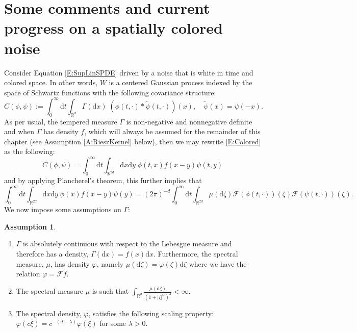 \documentclass[a4paper,11pt]{article}
\numberwithin{equation}{section}
\theoremstyle{plain}
\theoremstyle{definition}
\newtheorem{assumption}[theorem]{Assumption}
\newcommand{\ud}{\ensuremath{\mathrm{d} }}
\newcommand{\R}{\mathbb{R}}
\numberwithin{NQ}{section}
\numberwithin{LQ}{section}
\numberwithin{ZQ}{section}
\begin{document}
\section{Some comments and current progress on a spatially colored noise} \label{S:colorednoise}
Consider Equation \eqref{E:SupLinSPDE} driven by a noise that is white in time and colored space. In
other words, $W$ is a centered Gaussian process indexed by the space of Schwartz functions with the
following covariance structure:
\begin{equation} \label{E:Colored}
  C(\phi, \psi) := \int_0^\infty \ud t \int_{\R^{d}}  \Gamma(\ud x) \; (\phi(t,\cdot)*\tilde{\psi}(t,\cdot))(x), \quad \tilde{\psi}(x) = \psi(-x).
\end{equation}
As per usual, the tempered measure $\Gamma$ is non-negative and nonnegative definite and when
$\Gamma$ has density $f$, which will always be assumed for the remainder of this chapter (see
Assumption \ref{A:RieszKernel} below), then we may rewrite \eqref{E:Colored} as the following:
\[
C(\phi,\psi) = \int_0^\infty \ud t \int_{\R^{2d}} \ud x \ud y \; \phi(t,x) f(x-y) \psi(t,y)
\]
and by applying Plancherel's theorem, this further implies that
\[
\int_0^\infty \ud t \int_{\R^{2d}} \ud x \ud y \; \phi(x) f(x-y) \psi(y) = (2 \pi)^{-d} \int_0^\infty \ud t \int_{\R^{2d}} \mu(\ud \zeta) \mathcal{F}(\phi(t,\cdot))(\zeta) \overline{\mathcal{F}(\psi(t,\cdot))(\zeta)}.
\]
We now impose some assumptions on $\Gamma$:
\begin{assumption} \label{A:NoiseAssum1} $\;$
\begin{enumerate}
  \item $\Gamma$ is absolutely continuous with respect to the Lebesgue measure and therefore has a
    density, $\Gamma(\ud x) = f(x) \ud x$. Furthermore, the spectral measure, $\mu$, has density
    $\varphi$, namely $\mu(\ud \zeta) = \varphi(\zeta) \ud \zeta$ where we have the relation
    $\varphi = \mathcal{F}f$.
  \item The spectral measure $\mu$ is such that $\int_{\R^d} \frac{\mu(\ud \zeta)}{\left(1 +
    |\zeta|^\alpha\right)^2} < \infty$.
  \item The spectral density, $\varphi$, satisfies the following scaling property: $\varphi(c\xi) =
    c^{-(d-\lambda)}\varphi(\xi)$ for some $\lambda >0$.
\end{enumerate}
\end{assumption}
\end{document}
